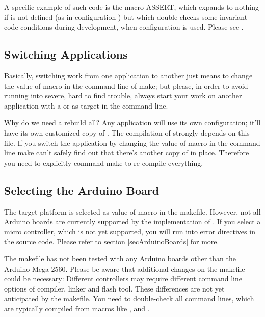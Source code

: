 A specific example of such code is the macro ASSERT, which expands to
nothing if  is not defined (as in configuration
) but which double-checks some invariant code conditions
during development, when configuration  is used. Please see
.


\subsection{Switching Applications}

Basically, switching work from one application to another just means to
change the value of macro  in the command line of make; but
please, in order to avoid running into severe, hard to find trouble, always
start your work on another application with a  or
 as target in the command line.

Why do we need a rebuild all? Any \rtos{} application will use its own
configuration; it'll have its own customized copy of
. The compilation of \rtos{} strongly depends on this
file. If you switch the application by changing the value of macro
 in the command line make can't safely find out that there's
another copy of  in place. Therefore you need to
explicitly command make to re-compile everything.


\subsection{Selecting the Arduino Board}
\label{secMakefileSelectBoard}

The target platform is selected as value of macro
 in the makefile. However, not all Arduino
boards are currently supported by the implementation of \rtos{}. If you
select a micro controller, which is not yet supported, you will run into error
directives in the source code. Please refer to section
\ref{secArduinoBoards} for more.

The makefile has not been tested with any Arduino boards other than the
Arduino Mega 2560. Please be aware that additional changes on the
makefile could be necessary: Different controllers may require different
command line options of compiler, linker and flash tool. These differences
are not yet anticipated by the makefile. You need to double-check all
command lines, which are typically compiled from macros like
,  and .

